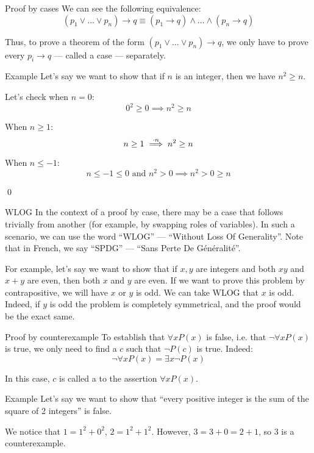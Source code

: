 \documentclass{article}
\begin{document}
\begin{parag}{Proof by cases}
    We can see the following equivalence: 
    \[\left(p_1 \lor \ldots \lor p_n\right) \to q \equiv \left(p_1 \to q\right) \land\ldots \land \left(p_n \to q\right)\]
    
    Thus, to prove a theorem of the form $\left(p_1 \lor \ldots \lor p_n\right) \to q$, we only have to prove every $p_i \to q$ --- called a case --- separately.

    \begin{subparag}{Example}
        Let's say we want to show that if $n$ is an integer, then we have $n^2 \geq n$. 

        Let's check when $n = 0$: 
        \[0^2 \geq 0 \implies n^2 \geq n\]
        
        When $n \geq 1$: 
        \[n \geq 1 \over{\implies}{$\cdot n$} n^2 \geq n\]

        When $n \leq -1$: 
        \[n \leq -1 \leq 0 \text{ and } n^2 > 0 \implies n^2 > 0 \geq n\]
        
        \qed
    \end{subparag}
    
    \begin{subparag}{WLOG}
        In the context of a proof by case, there may be a case that follows trivially from another (for example, by swapping roles of variables). In such a scenario, we can use the word ``WLOG'' --- ``Without Loss Of Generality''. Note that in French, we say ``SPDG'' --- ``Sans Perte De Généralité''.

        For example, let's say we want to show that if $x, y$ are integers and both $xy$ and $x + y$ are even, then both $x$ and $y$ are even. If we want to prove this problem by contrapositive, we will have $x$ or $y$ is odd. We can take WLOG that $x$ is odd. Indeed, if $y$ is odd the problem is completely symmetrical, and the proof would be the exact same.
    \end{subparag}
\end{parag}

\begin{parag}{Proof by counterexample}
    To establish that $\forall x P\left(x\right)$ is false, i.e. that $\lnot \forall x P\left(x\right)$ is true, we only need to find a $c$ such that $\lnot P\left(c\right)$ is true. Indeed: 
    \[\lnot \forall x P\left(x\right) = \exists x \lnot P\left(x\right)\]
    
    In this case, $c$ is called a  to the assertion $\forall x P\left(x\right)$.

    \begin{subparag}{Example}
        Let's say we  want to show that ``every positive integer is the sum of the square of 2 integers'' is false.

        We notice that $1 = 1^2 + 0^2$, $2 = 1^2 + 1^2$. However, $3 = 3 + 0 = 2 + 1$, so $3$ is a counterexample.
    \end{subparag}
\end{parag}
\end{document}
